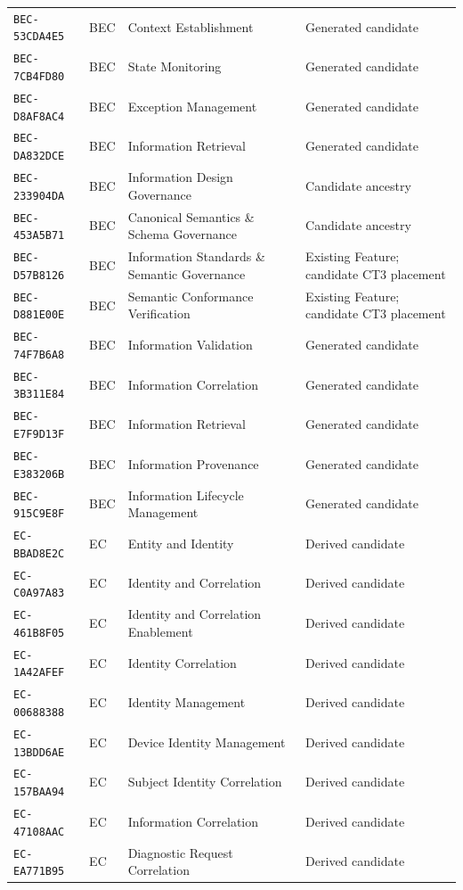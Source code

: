 \documentclass[11pt,a4paper,openany]{book}
\begin{document}
\begin{longtable}{@{}p{.19\linewidth}p{.12\linewidth}p{.39\linewidth}p{.24\linewidth}@{}}
\texttt{BEC-53CDA4E5} & BEC & Context Establishment & Generated candidate \\
\texttt{BEC-7CB4FD80} & BEC & State Monitoring & Generated candidate \\
\texttt{BEC-D8AF8AC4} & BEC & Exception Management & Generated candidate \\
\texttt{BEC-DA832DCE} & BEC & Information Retrieval & Generated candidate \\
\texttt{BEC-233904DA} & BEC & Information Design Governance & Candidate ancestry \\
\texttt{BEC-453A5B71} & BEC & Canonical Semantics \& Schema Governance & Candidate ancestry \\
\texttt{BEC-D57B8126} & BEC & Information Standards \& Semantic Governance & Existing Feature; candidate CT3 placement \\
\texttt{BEC-D881E00E} & BEC & Semantic Conformance Verification & Existing Feature; candidate CT3 placement \\
\texttt{BEC-74F7B6A8} & BEC & Information Validation & Generated candidate \\
\texttt{BEC-3B311E84} & BEC & Information Correlation & Generated candidate \\
\texttt{BEC-E7F9D13F} & BEC & Information Retrieval & Generated candidate \\
\texttt{BEC-E383206B} & BEC & Information Provenance & Generated candidate \\
\texttt{BEC-915C9E8F} & BEC & Information Lifecycle Management & Generated candidate \\
\texttt{EC-BBAD8E2C} & EC & Entity and Identity & Derived candidate \\
\texttt{EC-C0A97A83} & EC & Identity and Correlation & Derived candidate \\
\texttt{EC-461B8F05} & EC & Identity and Correlation Enablement & Derived candidate \\
\texttt{EC-1A42AFEF} & EC & Identity Correlation & Derived candidate \\
\texttt{EC-00688388} & EC & Identity Management & Derived candidate \\
\texttt{EC-13BDD6AE} & EC & Device Identity Management & Derived candidate \\
\texttt{EC-157BAA94} & EC & Subject Identity Correlation & Derived candidate \\
\texttt{EC-47108AAC} & EC & Information Correlation & Derived candidate \\
\texttt{EC-EA771B95} & EC & Diagnostic Request Correlation & Derived candidate \\

\end{longtable}
\end{document}
